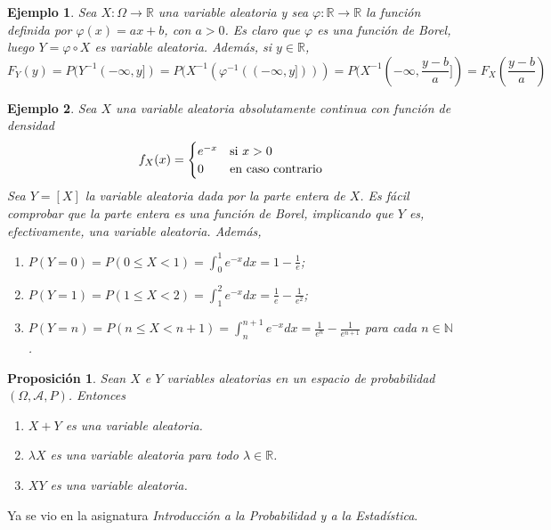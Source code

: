 \documentclass[11pt]{report}
\makeatletter
\renewenvironment{proof}[1][\proofname]{\par
  \pushQED{\qed}%
  \normalfont \topsep\z@skip %
  \trivlist
  \item[\hskip\labelsep
        \itshape
    #1\@addpunct{.}]\ignorespaces
}{%
  \popQED\endtrivlist\@endpefalse
}
\theoremstyle{mytheorem}
\newtheorem{proposition}{Proposición}
\theoremstyle{mydefinition}
\theoremstyle{myexample}
\newtheorem*{example}{Ejemplo}
\let\oldproofname=\proofname
\renewcommand{\proofname}{\rm\bf{\oldproofname}}}
\newenvironment{cproposition} %
  {\begin{mdframed}[
        linewidth=3pt,
        linecolor=c2,
        bottomline=false,
        topline=false,
        rightline=false,
        innerrightmargin=0pt,
        innertopmargin=0pt,
        innerbottommargin=0pt,
        innerleftmargin=1em,
        skipabove=\baselineskip]
    \begin{proposition}}
  {\end{proposition}\end{mdframed}}
\newcommand{\R}{\mathbb R}
\newcommand{\N}{\mathbb N}
\makeatother
\begin{document}
\begin{example}
Sea $X \colon \Omega \to \R$ una variable aleatoria y sea $\varphi \colon \R \to \R$ la función definida por $\varphi(x) = ax+b$, con $a > 0$. Es claro que $\varphi$ es una función de Borel, luego $Y = \varphi \circ X$ es variable aleatoria. Además, si $y \in \R$,
\[F_Y(y) = P(Y^{-1}(-\infty,y]) = P(X^{-1}(\varphi^{-1}((-\infty,y]))) = P(X^{-1}(-\infty,\textstyle{\frac{y-b}{a}}]) = F_X(\textstyle{\frac{y-b}{a}})\]
\end{example}

\begin{example}
Sea $X$ una variable aleatoria absolutamente continua con función de densidad
\[f_X(x) = \begin{cases}
    e^{-x} & $si$ \ x > 0 \\
    0 & $en caso contrario$
\end{cases}\]
Sea $Y = [X]$ la variable aleatoria dada por la parte entera de $X$. Es fácil comprobar que la parte entera es una función de Borel, implicando que $Y$ es, efectivamente, una variable aleatoria. Además,
\begin{enumerate}
    \item $P(Y = 0) = P(0 \leq X < 1) = \displaystyle{\int_0^1 e^{-x}dx}= 1-\frac{1}{e}$;
    \item $P(Y = 1) = P(1 \leq X < 2) = \displaystyle{\int_1^2 e^{-x}dx = \frac{1}{e}-\frac{1}{e^2}}$;
    \item $P(Y = n) = P(n \leq X < n+1) = \displaystyle{\int_n^{n+1} e^{-x}dx = \frac{1}{e^n}-\frac{1}{e^{n+1}}}$ para cada $n \in \N$.
\end{enumerate}
\end{example}

\begin{cproposition}
Sean $X$ e $Y$ variables aleatorias en un espacio de probabilidad $(\Omega,\mathcal{A},P)$. Entonces
\begin{enumerate}
    \item $X+Y$ es una variable aleatoria.
    \item $\lambda X$ es una variable aleatoria para todo $\lambda \in \R$.
    \item $XY$ es una variable aleatoria.
\end{enumerate}
\end{cproposition}

\begin{proof}
Ya se vio en la asignatura \textit{Introducción a la Probabilidad y a la Estadística}.
\end{proof}
\end{document}
